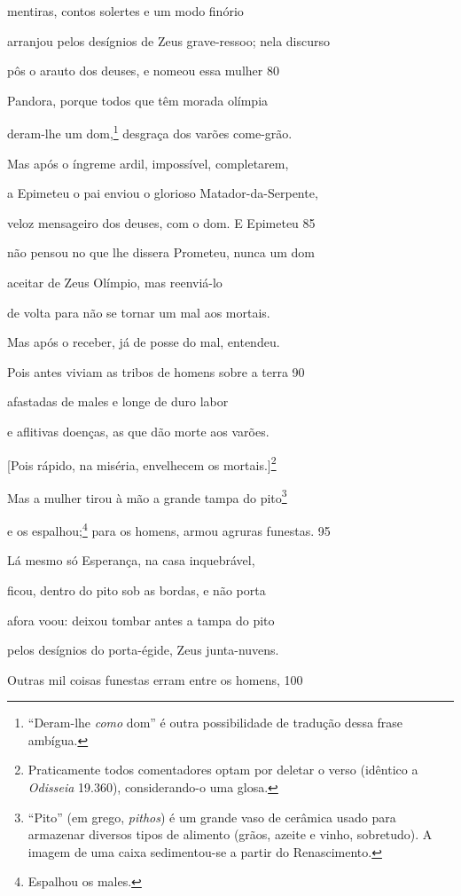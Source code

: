 mentiras, contos solertes e um modo finório

arranjou pelos desígnios de Zeus grave-ressoo; nela \qb{}discurso

pôs o arauto dos deuses, e nomeou essa mulher \num{80}

Pandora, porque todos que têm morada olímpia

deram-lhe um dom,\footnote{``Deram-lhe \emph{como} dom'' é outra possibilidade de tradução dessa frase ambígua.} desgraça dos varões come-grão.

Mas após o íngreme ardil, impossível, completarem,

a Epimeteu o pai enviou o glorioso Matador-da-Serpente,

veloz mensageiro dos deuses, com o dom. E Epimeteu \num{85}

não pensou no que lhe dissera Prometeu, nunca um dom

aceitar de Zeus Olímpio, mas reenviá-lo

de volta para não se tornar um mal aos mortais.

Mas após o receber, já de posse do mal, entendeu.

Pois antes viviam as tribos de homens sobre a terra \num{90}

afastadas de males e longe de duro labor

e aflitivas doenças, as que dão morte aos varões.

{[}Pois rápido, na miséria, envelhecem os mortais.{]}\footnote{Praticamente todos comentadores optam por deletar o verso (idêntico
a \emph{Odisseia} 19.360), considerando-o uma glosa.}

Mas a mulher tirou à mão a grande tampa do pito\footnote{``Pito'' (em grego, \emph{pithos}) é um grande vaso de cerâmica
usado para armazenar diversos tipos de alimento (grãos, azeite e vinho,
sobretudo). A imagem de uma caixa sedimentou-se a partir do
Renascimento.}

e os espalhou;\footnote{Espalhou os males.} para os homens, armou agruras funestas. \num{95}

Lá mesmo só Esperança, na casa inquebrável,

ficou, dentro do pito sob as bordas, e não porta

afora voou: deixou tombar antes a tampa do pito

pelos desígnios do porta-égide, Zeus junta-nuvens.

Outras mil coisas funestas erram entre os homens, \num{100}

